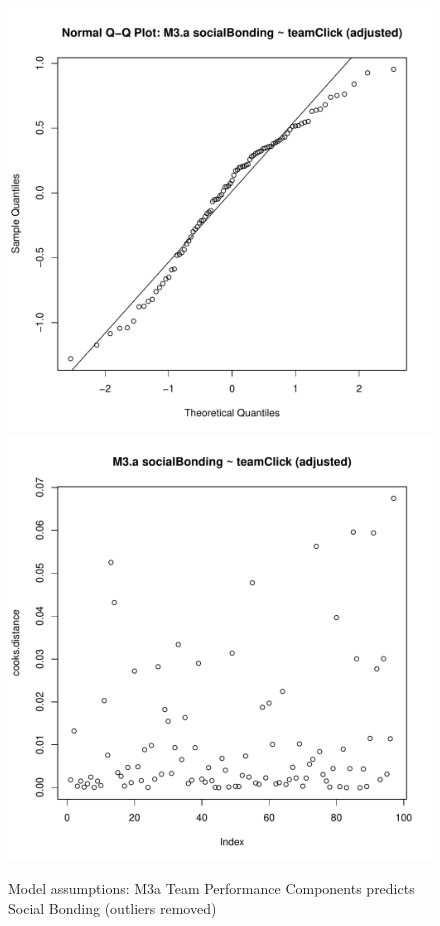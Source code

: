 {\begin{figure}[htbp]
        \includegraphics[scale =.4]{images/MLM3aOutQQNorm.pdf}
        \includegraphics[scale =.4]{images/MLM3aOutCooksD.pdf}
        \caption{Model assumptions: M3a Team Performance Components predicts Social Bonding (outliers removed)}
        \label{fig:MLM3aOutAssumptions}
      \end{figure}


}
